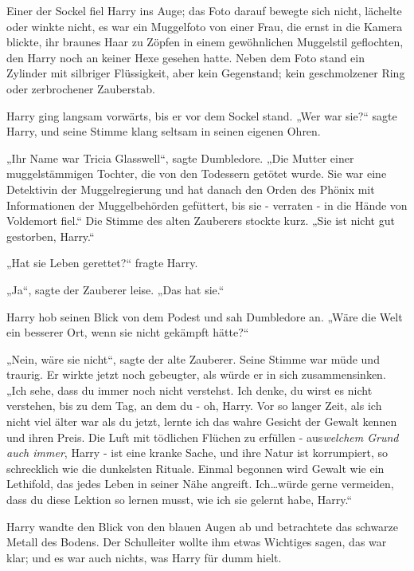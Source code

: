 {Einer der Sockel fiel Harry ins Auge; das Foto darauf bewegte sich nicht, lächelte oder winkte nicht, es war ein Muggelfoto von einer Frau, die ernst in die Kamera blickte, ihr braunes Haar zu Zöpfen in einem gewöhnlichen Muggelstil geflochten, den Harry noch an keiner Hexe gesehen hatte. Neben dem Foto stand ein Zylinder mit silbriger Flüssigkeit, aber kein Gegenstand; kein geschmolzener Ring oder zerbrochener Zauberstab.

Harry ging langsam vorwärts, bis er vor dem Sockel stand. „Wer war sie?“ sagte Harry, und seine Stimme klang seltsam in seinen eigenen Ohren.

„Ihr Name war Tricia Glasswell“, sagte Dumbledore. „Die Mutter einer muggelstämmigen Tochter, die von den Todessern getötet wurde. Sie war eine Detektivin der Muggelregierung und hat danach den Orden des Phönix mit Informationen der Muggelbehörden gefüttert, bis sie - verraten - in die Hände von Voldemort fiel.“ Die Stimme des alten Zauberers stockte kurz. „Sie ist nicht gut gestorben, Harry.“

„Hat sie Leben gerettet?“ fragte Harry.

„Ja“, sagte der Zauberer leise. „Das hat sie.“

Harry hob seinen Blick von dem Podest und sah Dumbledore an. „Wäre die Welt ein besserer Ort, wenn sie nicht gekämpft hätte?“

„Nein, wäre sie nicht“, sagte der alte Zauberer. Seine Stimme war müde und traurig. Er wirkte jetzt noch gebeugter, als würde er in sich zusammensinken. „Ich sehe, dass du immer noch nicht verstehst. Ich denke, du wirst es nicht verstehen, bis zu dem Tag, an dem du - oh, Harry. Vor so langer Zeit, als ich nicht viel älter war als du jetzt, lernte ich das wahre Gesicht der Gewalt kennen und ihren Preis. Die Luft mit tödlichen Flüchen zu erfüllen - aus\emph{welchem Grund auch immer}, Harry - ist eine kranke Sache, und ihre Natur ist korrumpiert, so schrecklich wie die dunkelsten Rituale. Einmal begonnen wird Gewalt wie ein Lethifold, das jedes Leben in seiner Nähe angreift. Ich…würde gerne vermeiden, dass du diese Lektion so lernen musst, wie ich sie gelernt habe, Harry.“

Harry wandte den Blick von den blauen Augen ab und betrachtete das schwarze Metall des Bodens. Der Schulleiter wollte ihm etwas Wichtiges sagen, das war klar; und es war auch nichts, was Harry für dumm hielt.

}
